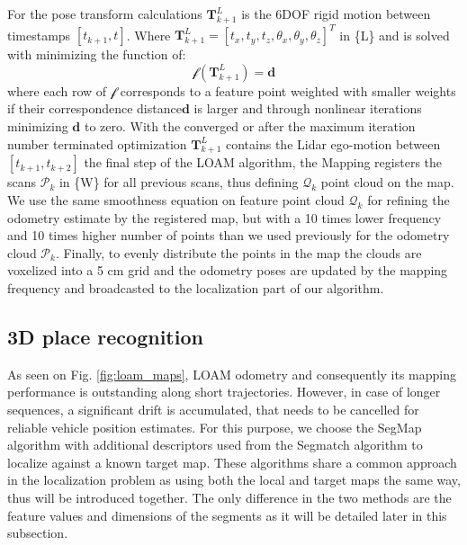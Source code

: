\documentclass[letterpaper, 10 pt, conference]{ieeeconf}  %
\begin{document}
For the pose transform calculations $\mathbf{T}^L_{k+1}$ is the 6DOF rigid motion between timestamps $[t_{k+1}, t]$. Where $\mathbf{T}^L_{k+1}=[t_x, t_y, t_z, \theta_x, \theta_y, \theta_z]^T$ in \{L\} and is solved with minimizing the function of: 
\begin{equation}
  \bm{\mathscr{f}}(\mathbf{T}^L_{k+1})=\mathbf{d}
\end{equation}
where each row of $\bm{\mathscr{f}}$ corresponds to a feature point weighted with smaller weights if their correspondence distance$\mathbf{d}$ is larger and through nonlinear iterations minimizing $\mathbf{d}$ to zero. 
With the converged or after the maximum iteration number terminated optimization $\mathbf{T}^L_{k+1}$ contains the Lidar ego-motion between $[t_{k+1}, t_{k+2}]$ the final step of the LOAM algorithm, the Mapping registers the scans $\mathcal{P}_k$ in \{W\} for all previous scans, thus defining $\mathcal{Q}_k$ point cloud on the map.
We use the same smoothness equation on feature point cloud $\mathcal{Q}_k$ for refining the odometry estimate by the registered map, but with a 10 times lower frequency and 10 times higher number of points than we used previously for the odometry cloud $\mathcal{P}_k$. 
Finally, to evenly distribute the points in the map the clouds are voxelized into a 5 cm grid and the odometry poses are updated by the mapping frequency and broadcasted to the localization part of our algorithm. 

\subsection{3D place recognition} \label{localization}
As seen on Fig. \ref{fig:loam_maps}, LOAM odometry and consequently its mapping performance is outstanding along short trajectories. However, in case of longer sequences, a significant drift is accumulated, that needs to be cancelled for reliable vehicle position estimates. For this purpose, we choose the SegMap algorithm with additional descriptors used from the Segmatch algorithm \cite{segmatch} to localize against a known target map. These algorithms share a common approach in the localization problem as using both the local and target maps the same way, thus will be introduced together. The only difference in the two methods are the feature values and dimensions of the segments as it will be detailed later in this subsection. 
\end{document}
